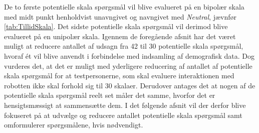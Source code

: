 \noindent
%
De to første potentielle skala spørgsmål vil blive evalueret på en bipolær skala med midt punkt henholdvist unavngivet og navngivet med \textit{Neutral}, jævnfør \autoref{tab:TillidSkala}. Det sidste potentielle skala spørgsmål vil derimod blive evalueret på en unipolær skala. \blankline
%
Igennem de foregående afsnit har det været muligt at reducere antallet af udsagn fra 42 til 30 potentielle skala spørgsmål, hvoraf ét vil blive anvendt i forbindelse med indsamling af demografisk data. Dog vurderes det, at det er muligt med yderligere reducering af antallet af potentielle skala spørgsmål for at testpersonerne, som skal evaluere interaktionen med robotten ikke skal forhold sig til 30 skalaer. Derudover antages det at nogen af de potentielle skala spørgsmål reelt set måler det samme, hvorfor det er hensigtsmæssigt at sammensætte dem. I det følgende afsnit vil der derfor blive fokuseret på at udvælge og reducere antallet potentielle skala spørgsmål samt omformulerer spørgsmålene, hvis nødvendigt. 
